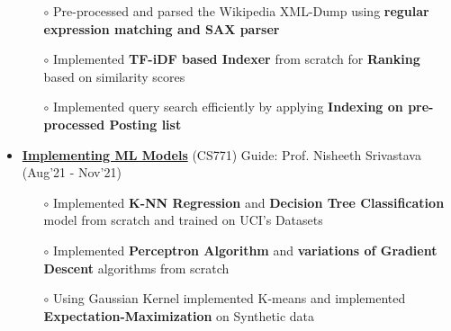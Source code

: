 \documentclass[10.8pt, a4paper]{extarticle}
\begin{document}
\begin{itemize}
\begin{itemize}
	\item [$\circ$] Pre-processed and parsed the Wikipedia XML-Dump using \textbf{regular expression matching and SAX parser}\\[-0.6cm]
	
	
	\item [$\circ$] Implemented \textbf{TF-iDF based Indexer} from scratch for \textbf{Ranking} based on similarity scores\\[-0.6cm]
	
	\item [$\circ$] Implemented query search efficiently by applying \textbf{Indexing on pre-processed Posting list}
	 
    
    \end{itemize}

 \item\href{https://github.com/jeetsarangi/Machine-Learning-CS771-}{\textbf{Implementing ML Models}} (CS771) Guide: Prof. Nisheeth Srivastava \hfill(Aug'21 - Nov'21)
    \\[-0.6cm]
	\begin{itemize}
	   
	      \item [$\circ$]Implemented \textbf{K-NN Regression} and \textbf{Decision Tree Classification} model  from scratch and trained on UCI's Datasets\\[-0.6cm]
	      \item [$\circ$] Implemented \textbf {Perceptron Algorithm} and \textbf {variations of Gradient Descent} algorithms from scratch\\[-0.6cm]
	      \item [$\circ$]Using Gaussian Kernel implemented K-means and implemented \textbf {Expectation-Maximization} on Synthetic data\\[-0.6cm]
	      

\end{itemize}
\end{itemize}
\end{document}
